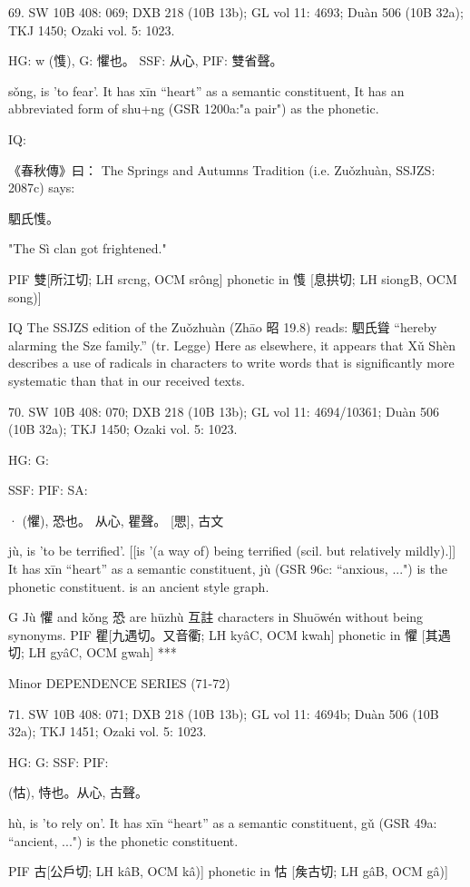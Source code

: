 69. SW 10B 408: 069; DXB 218 (10B 13b); GL vol 11: 4693; Duàn 506 (10B 32a); TKJ 1450; Ozaki vol. 5: 1023.

HG:  w (愯),
G:	懼也。
SSF: 从心,
PIF: 雙省聲。


sǒng,
is 'to fear'.
It has xīn ``heart'' as a semantic constituent,
It has an abbreviated form of shu+ng (GSR 1200a:"a pair") as the phonetic.

IQ:

《春秋傳》曰： The Springs and Autumns Tradition (i.e. Zuǒzhuàn, SSJZS: 2087c) says:

駟氏愯。

"The Sì clan got frightened."

PIF     雙[所江切; LH srcng, OCM srông] phonetic in 愯 [息拱切; LH siongB, OCM song)]



IQ	The SSJZS edition of the Zuǒzhuàn (Zhāo 昭 19.8) reads: 駟氏聳 ``hereby alarming the Sze family.'' (tr. Legge)
    Here as elsewhere, it appears that Xǔ Shèn describes a use of radicals in characters to write words that is significantly more systematic than that in our received texts.

70. SW 10B 408: 070; DXB 218 (10B 13b); GL vol 11: 4694/10361; Duàn 506 (10B 32a); TKJ 1450; Ozaki vol. 5:
1023.


HG:
G:

SSF: PIF: SA:

· (懼),
恐也。
从心, 瞿聲。
[愳], 古文


jù,
is 'to be terrified'. [[is '(a way of) being terrified (scil. but relatively mildly).]]
It has xīn ``heart'' as a semantic constituent,
jù (GSR 96c: ``anxious, ...") is the phonetic constituent.  is an ancient style graph.

G	Jù 懼 and kǒng 恐 are hūzhù 互註 characters in Shuōwén without being synonyms.
PIF     瞿[九遇切。又音衢; LH kyâC, OCM kwah] phonetic in 懼 [其遇切; LH gyâC, OCM gwah]
***

Minor DEPENDENCE SERIES (71-72)

71. SW 10B 408: 071; DXB 218 (10B 13b); GL vol 11: 4694b; Duàn 506 (10B 32a); TKJ 1451; Ozaki vol. 5: 1023.


HG:
G: SSF: PIF:

  (怙),
恃也。从心, 古聲。


hù,
is 'to rely on'.
It has xīn ``heart'' as a semantic constituent,
gǔ (GSR 49a: ``ancient, ...") is the phonetic constituent.

PIF     古[公戶切; LH kâB, OCM kâ)] phonetic in 怙 [矦古切; LH gâB, OCM gâ)]

